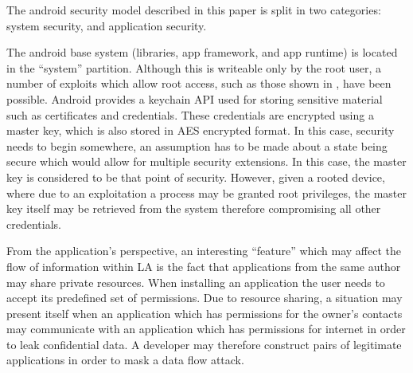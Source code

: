 The android security model described in this paper \cite{liebergeld2013android} is split in two categories: system security, and application security.

The android base system (libraries, app framework, and app runtime) is located in the ``system'' partition. Although this is writeable only by the root user, a number of exploits which allow root access, such as those shown in \cite{liebergeld2013android}, have been possible. Android provides a keychain API used for storing sensitive material such as certificates and credentials. These credentials are encrypted using a master key, which is also stored in AES encrypted format. In this case, security needs to begin somewhere, an assumption has to be made about a state being secure which would allow for multiple security extensions. In this case, the master key is considered to be that point of security. However, given a rooted device, where due to an exploitation a process may be granted root privileges, the master key itself may be retrieved from the system therefore compromising all other credentials.

From the application's perspective, an interesting ``feature'' which may affect the flow of information within LA is the fact that applications from the same author may share private resources. When installing an application the user needs to accept its predefined set of permissions. Due to resource sharing, a situation may present itself when an application which has permissions for the owner's contacts may communicate with an application which has permissions for internet in order to leak confidential data. A developer may therefore construct pairs of legitimate applications in order to mask a data flow attack.


